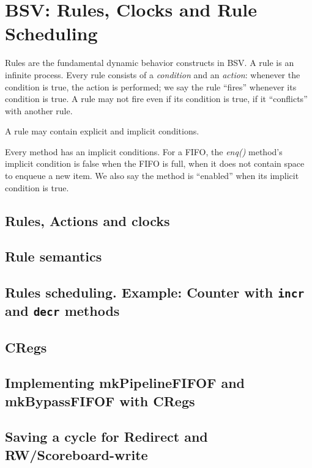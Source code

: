 

\chapter{BSV: Rules, Clocks and Rule  Scheduling}


\setcounter{page}{1}
\renewcommand{\thepage}{\arabic{chapter}-\arabic{page}}

\label{ch_Rules}


Rules are the fundamental dynamic behavior constructs in BSV.  A rule
is an infinite process.  Every rule consists of a \emph{condition} and
an \emph{action}: whenever the condition is true, the action is
performed; we say the rule ``fires'' whenever its condition is true.
A rule may not fire even if its condition is true, if it ``conflicts''
with another rule.

A rule may contain explicit and implicit conditions. 

Every method has an implicit conditions.  For a FIFO, the \emph{enq()}
method's implicit condition is false when the FIFO is full, {\ie} when
it does not contain space to enqueue a new item.  We also say the
method is ``enabled'' when its implicit condition is true.

\section{Rules, Actions and clocks}

\section{Rule semantics}

\section{Rules scheduling. Example: Counter with {\tt incr} and {\tt decr} methods}

\section{CRegs}

\section{Implementing mkPipelineFIFOF and mkBypassFIFOF with CRegs}

\section{Saving a cycle for Redirect and RW/Scoreboard-write}

